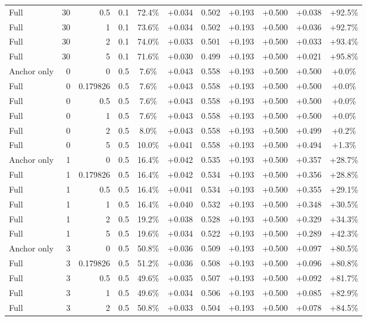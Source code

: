 \begin{table}[htbp]
\begin{tabular}{lrrrccccccc}
Full & 30 & 0.5 & 0.1 & 72.4\% & +0.034 & 0.502 & +0.193 & +0.500 & +0.038 & +92.5\% \\
Full & 30 & 1 & 0.1 & 73.6\% & +0.034 & 0.502 & +0.193 & +0.500 & +0.036 & +92.7\% \\
Full & 30 & 2 & 0.1 & 74.0\% & +0.033 & 0.501 & +0.193 & +0.500 & +0.033 & +93.4\% \\
Full & 30 & 5 & 0.1 & 71.6\% & +0.030 & 0.499 & +0.193 & +0.500 & +0.021 & +95.8\% \\
Anchor only & 0 & 0 & 0.5 & 7.6\% & +0.043 & 0.558 & +0.193 & +0.500 & +0.500 & +0.0\% \\
Full & 0 & 0.179826 & 0.5 & 7.6\% & +0.043 & 0.558 & +0.193 & +0.500 & +0.500 & +0.0\% \\
Full & 0 & 0.5 & 0.5 & 7.6\% & +0.043 & 0.558 & +0.193 & +0.500 & +0.500 & +0.0\% \\
Full & 0 & 1 & 0.5 & 7.6\% & +0.043 & 0.558 & +0.193 & +0.500 & +0.500 & +0.0\% \\
Full & 0 & 2 & 0.5 & 8.0\% & +0.043 & 0.558 & +0.193 & +0.500 & +0.499 & +0.2\% \\
Full & 0 & 5 & 0.5 & 10.0\% & +0.041 & 0.558 & +0.193 & +0.500 & +0.494 & +1.3\% \\
Anchor only & 1 & 0 & 0.5 & 16.4\% & +0.042 & 0.535 & +0.193 & +0.500 & +0.357 & +28.7\% \\
Full & 1 & 0.179826 & 0.5 & 16.4\% & +0.042 & 0.534 & +0.193 & +0.500 & +0.356 & +28.8\% \\
Full & 1 & 0.5 & 0.5 & 16.4\% & +0.041 & 0.534 & +0.193 & +0.500 & +0.355 & +29.1\% \\
Full & 1 & 1 & 0.5 & 16.4\% & +0.040 & 0.532 & +0.193 & +0.500 & +0.348 & +30.5\% \\
Full & 1 & 2 & 0.5 & 19.2\% & +0.038 & 0.528 & +0.193 & +0.500 & +0.329 & +34.3\% \\
Full & 1 & 5 & 0.5 & 19.6\% & +0.034 & 0.522 & +0.193 & +0.500 & +0.289 & +42.3\% \\
Anchor only & 3 & 0 & 0.5 & 50.8\% & +0.036 & 0.509 & +0.193 & +0.500 & +0.097 & +80.5\% \\
Full & 3 & 0.179826 & 0.5 & 51.2\% & +0.036 & 0.508 & +0.193 & +0.500 & +0.096 & +80.8\% \\
Full & 3 & 0.5 & 0.5 & 49.6\% & +0.035 & 0.507 & +0.193 & +0.500 & +0.092 & +81.7\% \\
Full & 3 & 1 & 0.5 & 49.6\% & +0.034 & 0.506 & +0.193 & +0.500 & +0.085 & +82.9\% \\
Full & 3 & 2 & 0.5 & 50.8\% & +0.033 & 0.504 & +0.193 & +0.500 & +0.078 & +84.5\% \\

\end{tabular}
\end{table}
